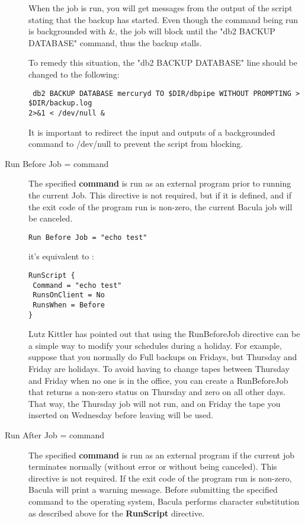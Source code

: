 \begin{description}
When the job is run, you will get messages from the output of the script
stating that the backup has started. Even though the command being run is
backgrounded with \&, the job will block until the "db2 BACKUP DATABASE"
command, thus the backup stalls.
 
To remedy this situation, the "db2 BACKUP DATABASE" line should be changed to
the following:
 
\footnotesize
\begin{verbatim} 
 db2 BACKUP DATABASE mercuryd TO $DIR/dbpipe WITHOUT PROMPTING > $DIR/backup.log
2>&1 < /dev/null &
\end{verbatim}
\normalsize

It is important to redirect the input and outputs of a backgrounded command to
/dev/null to prevent the script from blocking.

\item [Run Before Job = \lt{}command\gt{}]
The specified {\bf command} is run as an external program prior to running the
current Job.  This directive is not required, but if it is defined, and if the
exit code of the program run is non-zero, the current Bacula job will be
canceled.

\begin{verbatim}
Run Before Job = "echo test"
\end{verbatim}
   it's equivalent to :
\begin{verbatim}
RunScript {
 Command = "echo test"
 RunsOnClient = No
 RunsWhen = Before
}
\end{verbatim} 

   Lutz Kittler has pointed out that using the RunBeforeJob directive can be a
   simple way to modify your schedules during a holiday.  For example, suppose
   that you normally do Full backups on Fridays, but Thursday and Friday are
   holidays.  To avoid having to change tapes between Thursday and Friday when
   no one is in the office, you can create a RunBeforeJob that returns a
   non-zero status on Thursday and zero on all other days.  That way, the
   Thursday job will not run, and on Friday the tape you inserted on Wednesday
   before leaving will be used.

\item [Run After Job = \lt{}command\gt{}]
   The specified {\bf command} is run as an external program if the current
   job terminates normally (without error or without being canceled).  This
   directive is not required.  If the exit code of the program run is
   non-zero, Bacula will print a warning message.  Before submitting the
   specified command to the operating system, Bacula performs character
   substitution as described above for the {\bf RunScript} directive.
   

\end{description}
